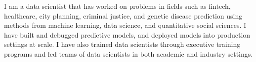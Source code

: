 

\begin{cvparagraph}
I am a data scientist that has worked on problems in fields such as fintech, healthcare, city planning, criminal justice,
and genetic disease prediction using methods from machine learning, data science, and quantitative social sciences.
I have built and debugged predictive models, and deployed models into production settings at scale. I have also trained
data scientists through executive training programs and led teams of data scientists in both academic and industry settings.
\end{cvparagraph}
